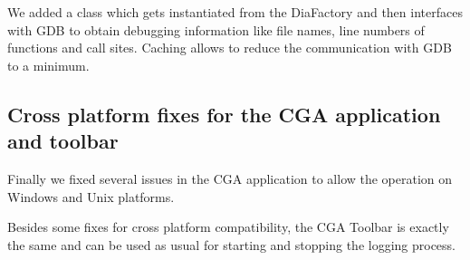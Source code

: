 We added a class which gets instantiated from the DiaFactory and then interfaces with GDB to obtain debugging information like file names, line numbers of functions and call sites. Caching allows to reduce the communication with GDB to a minimum.

\subsection{Cross platform fixes for the CGA application and toolbar}

Finally we fixed several issues in the CGA application to allow the operation on Windows and Unix platforms.

Besides some fixes for cross platform compatibility, the CGA Toolbar is exactly the same and can be used as usual for starting and stopping the logging process.

